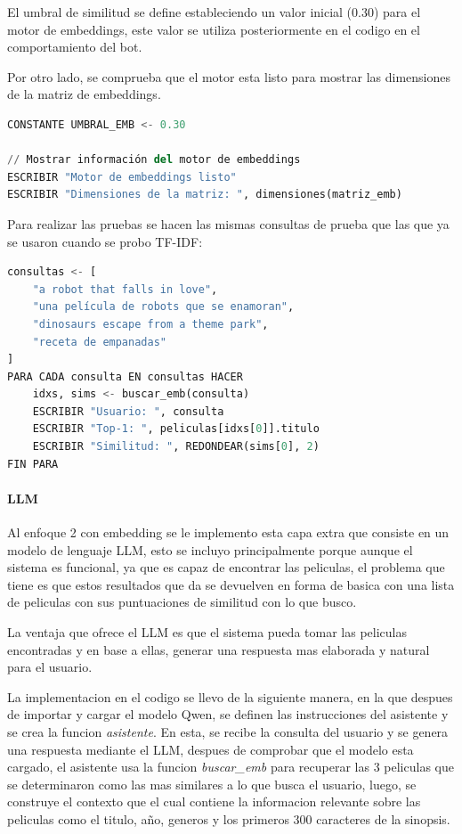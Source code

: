 El umbral de similitud se define estableciendo un valor inicial (0.30) para el motor de embeddings, este valor se utiliza posteriormente en el codigo en el comportamiento del bot.

Por otro lado, se comprueba que el motor esta listo para mostrar las dimensiones de la matriz de embeddings. 

\begin{lstlisting}[language=Python, caption={~}]
CONSTANTE UMBRAL_EMB <- 0.30

// Mostrar información del motor de embeddings
ESCRIBIR "Motor de embeddings listo"
ESCRIBIR "Dimensiones de la matriz: ", dimensiones(matriz_emb)
\end{lstlisting}

Para realizar las pruebas se hacen las mismas consultas de prueba que las que ya se usaron cuando se probo TF-IDF:

\begin{lstlisting}[language=Python, caption={~}]
consultas <- [
    "a robot that falls in love",
    "una película de robots que se enamoran",
    "dinosaurs escape from a theme park",
    "receta de empanadas"
]
PARA CADA consulta EN consultas HACER
    idxs, sims <- buscar_emb(consulta)
    ESCRIBIR "Usuario: ", consulta
    ESCRIBIR "Top-1: ", peliculas[idxs[0]].titulo
    ESCRIBIR "Similitud: ", REDONDEAR(sims[0], 2)
FIN PARA
\end{lstlisting}

\paragraph{LLM}

Al enfoque 2 con embedding se le implemento esta capa extra que consiste en un modelo de lenguaje LLM, esto se incluyo principalmente porque aunque el sistema es funcional, ya que es capaz de encontrar las peliculas, el problema que tiene es que estos resultados que da se devuelven en forma de basica con una lista de peliculas con sus puntuaciones de similitud con lo que busco.

La ventaja que ofrece el LLM es que el sistema pueda tomar las peliculas encontradas y en base a ellas, generar una respuesta mas elaborada y natural para el usuario.

La implementacion en el codigo se llevo de la siguiente manera, en la que despues de importar y cargar el modelo Qwen, se definen las instrucciones del asistente y se crea la funcion \textit{asistente}. En esta, se recibe la consulta del usuario y se genera una respuesta mediante el LLM, despues de comprobar que el modelo esta cargado, el asistente usa la funcion \textit{buscar\_emb} para recuperar las 3 peliculas que se determinaron como las mas similares a lo que busca el usuario, luego, se construye el contexto que el cual contiene la informacion relevante sobre las peliculas como el titulo, año, generos y los primeros 300 caracteres de la sinopsis.

